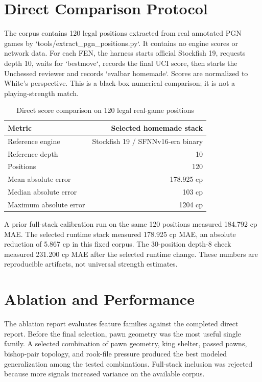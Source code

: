 \documentclass[10pt,conference]{IEEEtran}
\begin{document}
\section{Direct Comparison Protocol}
The corpus contains 120 legal positions extracted from real annotated PGN games by `tools/extract\_pgn\_positions.py`. It contains no engine scores or network data. For each FEN, the harness starts official Stockfish 19, requests depth 10, waits for `bestmove`, records the final UCI score, then starts the Unchessed reviewer and records `evalbar homemade`. Scores are normalized to White's perspective. This is a black-box numerical comparison; it is not a playing-strength match.

\begin{table}[t]
\centering
\caption{Direct score comparison on 120 legal real-game positions}
\label{tab:direct}
\begin{tabular}{lr}
\toprule
Metric & Selected homemade stack\\
\midrule
Reference engine & Stockfish 19 / SFNNv16-era binary\\
Reference depth & 10\\
Positions & 120\\
Mean absolute error & 178.925 cp\\
Median absolute error & 103 cp\\
Maximum absolute error & 1204 cp\\
\bottomrule
\end{tabular}
\end{table}

A prior full-stack calibration run on the same 120 positions measured 184.792 cp MAE. The selected runtime stack measured 178.925 cp MAE, an absolute reduction of 5.867 cp in this fixed corpus. The 30-position depth-8 check measured 231.200 cp MAE after the selected runtime change. These numbers are reproducible artifacts, not universal strength estimates.

\section{Ablation and Performance}
The ablation report evaluates feature families against the completed direct report. Before the final selection, pawn geometry was the most useful single family. A selected combination of pawn geometry, king shelter, passed pawns, bishop-pair topology, and rook-file pressure produced the best modeled generalization among the tested combinations. Full-stack inclusion was rejected because more signals increased variance on the available corpus.
\end{document}
